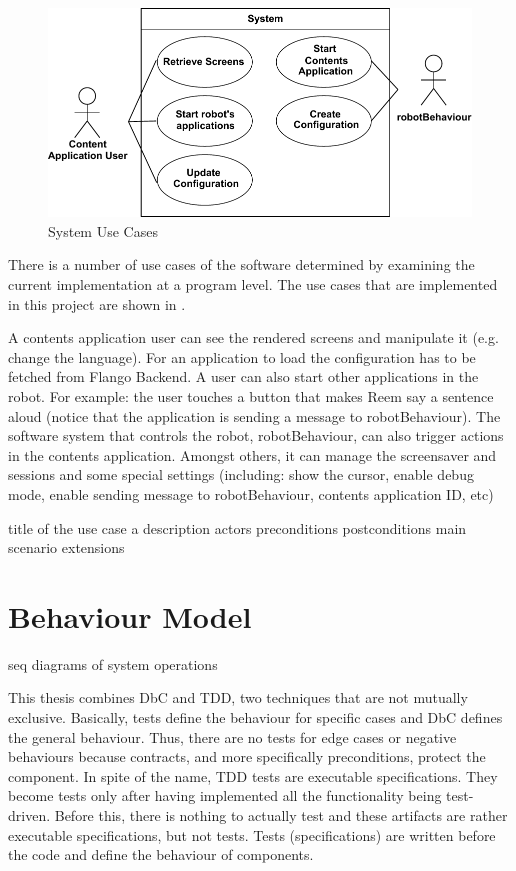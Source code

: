 \begin{figure}[htb]  
    \centering
    \includegraphics[width=\linewidth]{figures/specification-sucs}
    \caption{System Use Cases}
    \label{fig:specification-sucs}
\end{figure}

There is a number of use cases of the software determined by examining the current implementation at a program level.
The use cases that are implemented in this project are shown in .

A contents application user can see the rendered screens and manipulate it (e.g. change the language).
For an application to load the configuration has to be fetched from Flango Backend.
A user can also start other applications in the robot.
For example: the user touches a button that makes Reem say a sentence aloud (notice that the application is sending a message to robotBehaviour).
The software system that controls the robot, robotBehaviour, can also trigger actions in the contents application.
Amongst others, it can manage the screensaver and sessions and some special settings (including: show the cursor, enable debug mode, enable sending message to robotBehaviour, contents application ID, etc)

\begin{suc}
{title of the use case}
{a description}
{actors}
{preconditions}
{postconditions}
{main scenario}
{extensions}
\end{suc}


\section{Behaviour Model}
seq diagrams of system operations

This thesis combines \ac{DbC} and \ac{TDD}, two techniques that are not mutually exclusive.
Basically, tests define the behaviour for specific cases and \ac{DbC} defines the general behaviour. 
Thus, there are no tests for edge cases or negative behaviours because contracts, and more specifically preconditions, protect the component.
In spite of the name, \ac{TDD} tests are executable specifications.
They become tests only after having implemented all the functionality being test-driven.
Before this, there is nothing to actually test and these artifacts are rather executable specifications, but not tests.
Tests (specifications) are written before the code and define the behaviour of components.

